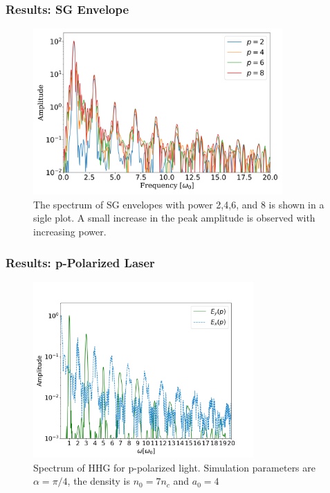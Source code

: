 \documentclass{beamer}
\begin{document}
\begin{frame}
    \frametitle{Results: SG Envelope}
    \begin{figure}[h]
        \centering
        \includegraphics[width=0.85\textwidth]{images/sg.png}
        \caption{The spectrum of SG envelopes with power 2,4,6, and 8 is shown in a sigle plot. A small increase in the peak amplitude is observed with increasing power.}
        \label{fig:sg}
    \end{figure}
\end{frame}

\begin{frame}
    \frametitle{Results: p-Polarized Laser}
    \begin{figure}[h]
        \centering
        \includegraphics[width=0.75\textwidth]{images/p_fft.png}
        \caption{\small{Spectrum of HHG for p-polarized light. Simulation parameters are $\alpha = \pi/4$, the density is $n_0 = 7n_c$ and $a_0 = 4$}}
    \end{figure}
\end{frame}
\end{document}
